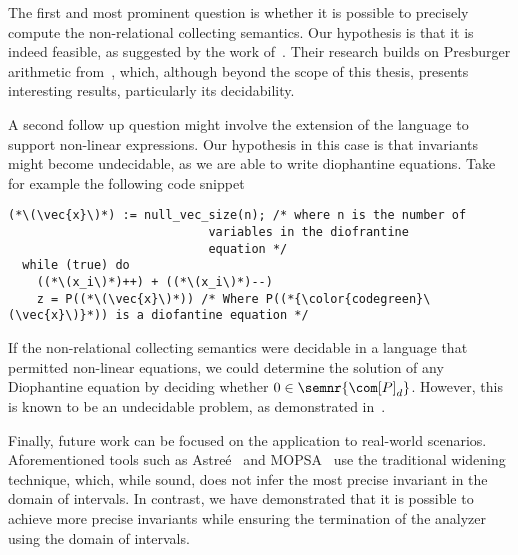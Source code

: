 The first and most prominent question is whether it is possible to
precisely compute the non-relational collecting semantics. Our
hypothesis is that it is indeed feasible, as suggested by the work
of~\cite{Lefaucheux2024}. Their research builds on Presburger
arithmetic from~\cite{1571698599431503232}, which, although beyond the
scope of this thesis, presents interesting results, particularly its
decidability.

A second follow up question might involve the extension of the
language to support non-linear expressions. Our hypothesis in this
case is that invariants might become undecidable, as we are able to
write diophantine equations. Take for example the following code
snippet
\begin{lstlisting}[language=Imp, caption=Program with diofantine equations, label=code5]
  (*\(\vec{x}\)*) := null_vec_size(n); /* where n is the number of
                            variables in the diofrantine
                            equation */
  while (true) do
    ((*\(x_i\)*)++) + ((*\(x_i\)*)--)
    z = P((*\(\vec{x}\)*)) /* Where P((*{\color{codegreen}\(\vec{x}\)}*)) is a diofantine equation */
\end{lstlisting}
If the non-relational collecting semantics were decidable in a
language that permitted non-linear equations, we could determine the
solution of any Diophantine equation by deciding whether
\(0 \in \semnr{{\com[P]}_d}\). However, this is known to be an
undecidable problem, as demonstrated in~\cite{zbMATH03336816}.

Finally, future work can be focused on the application to real-world
scenarios. Aforementioned tools such as
Astreé~\cite{10.1007/978-3-540-31987-0_3} and
MOPSA~\cite{10.1007/978-3-031-30820-8_37} use the traditional widening
technique, which, while sound, does not infer the most precise
invariant in the domain of intervals. In contrast, we have
demonstrated that it is possible to achieve more precise invariants
while ensuring the termination of the analyzer using the domain of
intervals.

